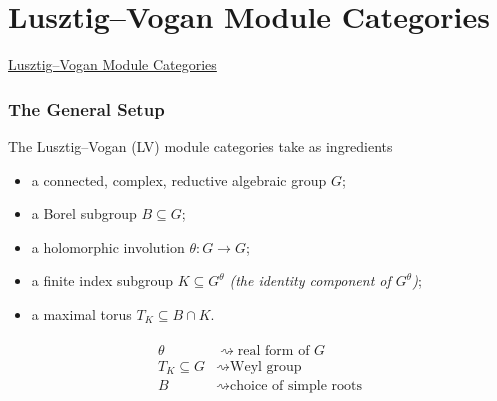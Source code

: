 \documentclass{beamer}
\begin{document}

\section{Lusztig--Vogan Module Categories}

\begin{frame}
\noindent\centerline{\LARGE\textcolor{structure}{\underline{Lusztig--Vogan Module Categories}}}
\end{frame}

\begin{frame}
\frametitle{The General Setup}
The Lusztig--Vogan (LV) module categories take as ingredients
\begin{itemize}
\item a connected, complex, reductive algebraic group $G$;
\item a Borel subgroup $B \subseteq G$;
\item a holomorphic involution $\theta : G \to G$;
\item a finite index subgroup $K \subseteq G^\theta$ \textit{(the identity component of $G^\theta$)};
\item a maximal torus $T_K \subseteq B \cap K$.\\
\end{itemize}
\begin{align*}
\begin{split}
\theta &\rightsquigarrow \text{real form of $G$}\\
T_K \subseteq G &\rightsquigarrow \text{Weyl group}\\
B &\rightsquigarrow \text{choice of simple roots}%
\end{split}
\end{align*}
\end{frame}
\end{document}
